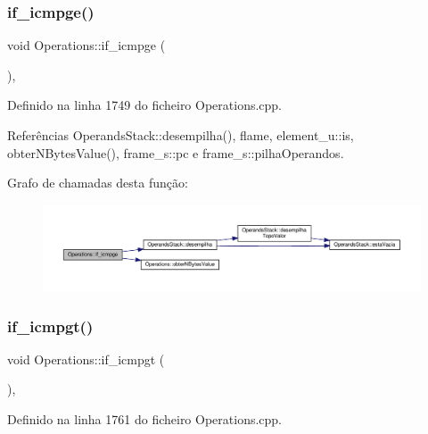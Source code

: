 \subsubsection{\texorpdfstring{if\+\_\+icmpge()}{if\_icmpge()}}
{\footnotesize\ttfamily void Operations\+::if\+\_\+icmpge (\begin{DoxyParamCaption}{ }\end{DoxyParamCaption})\hspace{0.3cm}{\ttfamily [static]}, {\ttfamily [private]}}



Definido na linha 1749 do ficheiro Operations.\+cpp.



Referências Operands\+Stack\+::desempilha(), flame, element\+\_\+u\+::is, obter\+N\+Bytes\+Value(), frame\+\_\+s\+::pc e frame\+\_\+s\+::pilha\+Operandos.

Grafo de chamadas desta função\+:
\nopagebreak
\begin{figure}[H]
\begin{center}
\leavevmode
\includegraphics[width=350pt]{classOperations_a147f088fabd19030a535ac68ff091be1_cgraph}
\end{center}
\end{figure}
\mbox{\label{classOperations_a40232532d2522ef0afe261555688a7fd}} 
\subsubsection{\texorpdfstring{if\+\_\+icmpgt()}{if\_icmpgt()}}
{\footnotesize\ttfamily void Operations\+::if\+\_\+icmpgt (\begin{DoxyParamCaption}{ }\end{DoxyParamCaption})\hspace{0.3cm}{\ttfamily [static]}, {\ttfamily [private]}}



Definido na linha 1761 do ficheiro Operations.\+cpp.



